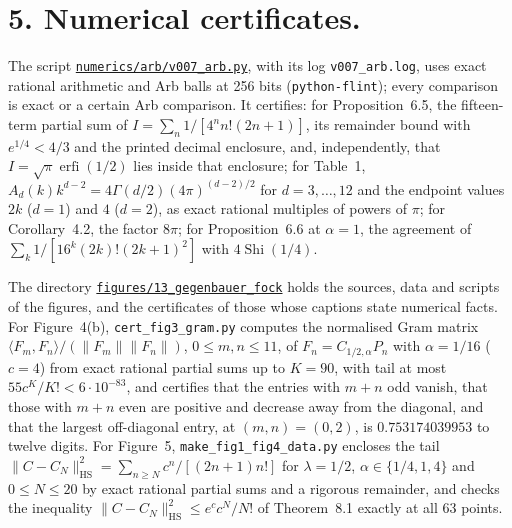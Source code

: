 \documentclass[11pt,a4paper]{article}
\newcommand{\R}{https://github.com/ralfanop/Certifications_Eulerian_polar-curve_computations}
\begin{document}
\section*{5. Numerical certificates.}
The script \href{\R/blob/main/numerics/arb/v007_arb.py}{\texttt{numerics/arb/v007\_arb.py}}, with its log \texttt{v007\_arb.log}, uses exact rational arithmetic and Arb balls at 256 bits (\texttt{python-flint}); every comparison is exact or a certain Arb comparison. It certifies: for Proposition~6.5, the fifteen-term partial sum of $I=\sum_n1/[4^nn!(2n+1)]$, its remainder bound with $e^{1/4}<4/3$ and the printed decimal enclosure, and, independently, that $I=\sqrt\pi\operatorname{erfi}(1/2)$ lies inside that enclosure; for Table~1, $A_d(k)k^{d-2}=4\Gamma(d/2)(4\pi)^{(d-2)/2}$ for $d=3,\ldots,12$ and the endpoint values $2k$ ($d=1$) and $4$ ($d=2$), as exact rational multiples of powers of $\pi$; for Corollary~4.2, the factor $8\pi$; for Proposition~6.6 at $\alpha=1$, the agreement of $\sum_k1/[16^k(2k)!(2k+1)^2]$ with $4\operatorname{Shi}(1/4)$.

The directory \href{\R/tree/main/figures/13_gegenbauer_fock}{\texttt{figures/13\_gegenbauer\_fock}} holds the sources, data and scripts of the figures, and the certificates of those whose captions state numerical facts. For Figure~4(b), \texttt{cert\_fig3\_gram.py} computes the normalised Gram matrix $\langle F_m,F_n\rangle/(\|F_m\|\|F_n\|)$, $0\leq m,n\leq11$, of $F_n=C_{1/2,\alpha}P_n$ with $\alpha=1/16$ ($c=4$) from exact rational partial sums up to $K=90$, with tail at most $55c^K/K!<6\cdot10^{-83}$, and certifies that the entries with $m+n$ odd vanish, that those with $m+n$ even are positive and decrease away from the diagonal, and that the largest off-diagonal entry, at $(m,n)=(0,2)$, is $0.753174039953$ to twelve digits. For Figure~5, \texttt{make\_fig1\_fig4\_data.py} encloses the tail $\|C-C_N\|_{\mathrm{HS}}^2=\sum_{n\geq N}c^n/[(2n+1)n!]$ for $\lambda=1/2$, $\alpha\in\{1/4,1,4\}$ and $0\leq N\leq20$ by exact rational partial sums and a rigorous remainder, and checks the inequality $\|C-C_N\|_{\mathrm{HS}}^2\leq e^cc^N/N!$ of Theorem~8.1 exactly at all 63 points.
\end{document}
